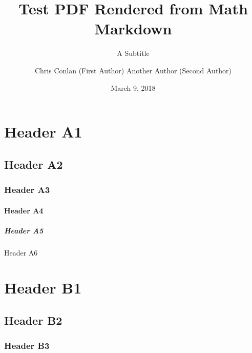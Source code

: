 \documentclass[
                ]
{article}
\title{Test PDF Rendered from Math Markdown}
\subtitle{A Subtitle}
\author{
                    Chris Conlan (First Author)                    Another Author (Second Author)    }
\date{March 9, 2018}
\begin{document}
\maketitle



    {
        \hypersetup{linkcolor=black}
        \setcounter{tocdepth}{3}
        \tableofcontents
    }


    \listoftables

    \listoffigures

\hypertarget{header-a1}{%
\section{Header A1}\label{header-a1}}

\hypertarget{header-a2}{%
\subsection{Header A2}\label{header-a2}}

\hypertarget{header-a3}{%
\subsubsection{Header A3}\label{header-a3}}

\hypertarget{header-a4}{%
\paragraph{Header A4}\label{header-a4}}

\hypertarget{header-a5}{%
\subparagraph{Header A5}\label{header-a5}}

Header A6

\hypertarget{header-b1}{%
\section{Header B1}\label{header-b1}}

\hypertarget{header-b2}{%
\subsection{Header B2}\label{header-b2}}

\hypertarget{header-b3}{%
\subsubsection{Header B3}\label{header-b3}}
\end{document}
